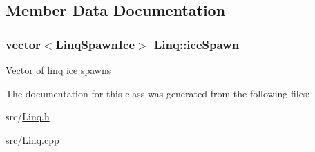 \subsection{Member Data Documentation}
\hypertarget{classLinq_ac3cb5607d252c5462bfac2a5011bc41a}{
\subsubsection[{iceSpawn}]{\setlength{\rightskip}{0pt plus 5cm}vector$<${\bf LinqSpawnIce}$>$ {\bf Linq::iceSpawn}}}
\label{classLinq_ac3cb5607d252c5462bfac2a5011bc41a}
Vector of linq ice spawns 

The documentation for this class was generated from the following files:\begin{DoxyCompactItemize}
\item 
src/\hyperlink{Linq_8h}{Linq.h}\item 
src/Linq.cpp\end{DoxyCompactItemize}
